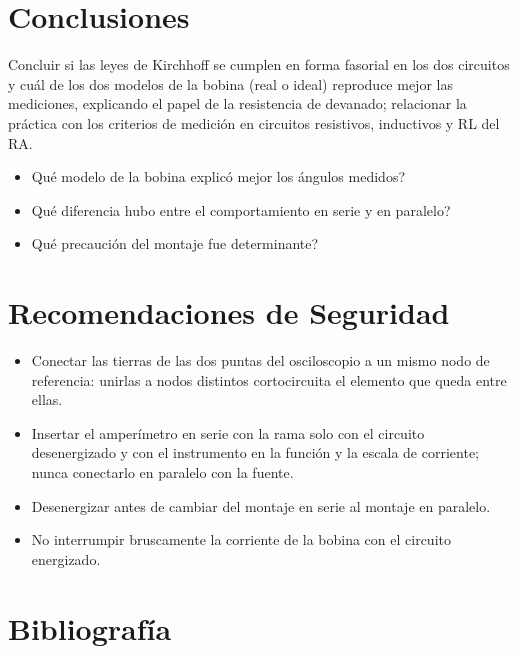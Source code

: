 \documentclass[12pt]{article}
\begin{document}
\section{Conclusiones}\label{sec:conclusiones}
Concluir si las leyes de Kirchhoff se cumplen en forma fasorial en los dos circuitos y cuál de los dos modelos de la bobina (real o ideal) reproduce mejor las mediciones, explicando el papel de la resistencia de devanado; relacionar la práctica con los criterios de medición en circuitos resistivos, inductivos y RL del RA.
\lineablanco
\begin{itemize}
  \item \textquestiondown{}Qué modelo de la bobina explicó mejor los ángulos medidos?
  \item \textquestiondown{}Qué diferencia hubo entre el comportamiento en serie y en paralelo?
  \item \textquestiondown{}Qué precaución del montaje fue determinante?
\end{itemize}

\section{Recomendaciones de Seguridad}\label{sec:seguridad}
\begin{itemize}
  \item Conectar las tierras de las dos puntas del osciloscopio a un mismo nodo de referencia: unirlas a nodos distintos cortocircuita el elemento que queda entre ellas.
  \item Insertar el amperímetro en serie con la rama solo con el circuito desenergizado y con el instrumento en la función y la escala de corriente; nunca conectarlo en paralelo con la fuente.
  \item Desenergizar antes de cambiar del montaje en serie al montaje en paralelo.
  \item No interrumpir bruscamente la corriente de la bobina con el circuito energizado.
\end{itemize}

\section{Bibliografía}\label{sec:bibliografia}
\nocite{*}
\bibliografia
\end{document}
